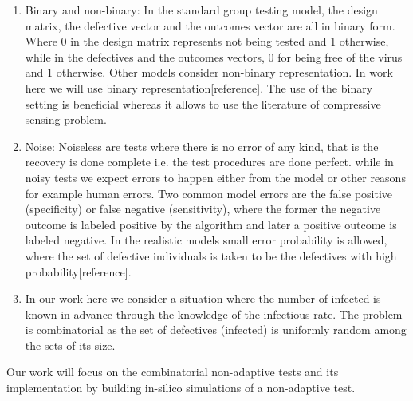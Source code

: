 \documentclass[12pt,a4paper]{article}
\begin{document}
	 \begin{enumerate}
	 	\item Binary and non-binary: In the standard group testing model, the design matrix, the defective vector and the outcomes vector are all in binary form. Where 0 in the design matrix represents not being tested and 1 otherwise, while in the defectives and the outcomes vectors, 0 for being free of the virus and 1 otherwise. Other models consider non-binary representation. In work here we will use binary representation[reference]. The use of the binary setting is beneficial whereas it allows to use the literature of compressive sensing problem.   
	 	\item Noise: Noiseless are tests where there is no error of any kind, that is the recovery is done complete i.e. the test procedures are done perfect. while in noisy tests we expect errors to happen either from the model or other reasons for example human errors. Two common model errors  are the false positive (specificity) or false negative (sensitivity), where the former the negative outcome is labeled positive by the algorithm and later a positive outcome is labeled negative. In the realistic models small error probability is allowed, where the set of defective individuals is taken to be the defectives with high probability[reference]. 
	 	
	 	\item In our work here we consider a situation where the number of infected is known in advance through the knowledge of the infectious rate. The problem is combinatorial as the set of defectives (infected) is uniformly random among the sets of its size.    
	 \end{enumerate}
	 
	    Our work will focus on the combinatorial non-adaptive tests and its implementation  by building in-silico  simulations of a non-adaptive test. 
	 
\end{document}
